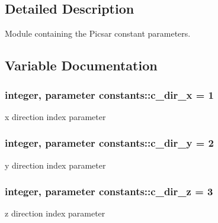 \subsection{Detailed Description}
Module containing the Picsar constant parameters. 

\subsection{Variable Documentation}
\subsubsection[{\texorpdfstring{c\+\_\+dir\+\_\+x}{c_dir_x}}]{\setlength{\rightskip}{0pt plus 5cm}integer, parameter constants\+::c\+\_\+dir\+\_\+x = 1}\hypertarget{namespaceconstants_a8e38e74e9723ce351e7a20787e649e89}{}\label{namespaceconstants_a8e38e74e9723ce351e7a20787e649e89}


x direction index parameter 

\subsubsection[{\texorpdfstring{c\+\_\+dir\+\_\+y}{c_dir_y}}]{\setlength{\rightskip}{0pt plus 5cm}integer, parameter constants\+::c\+\_\+dir\+\_\+y = 2}\hypertarget{namespaceconstants_a5d84bc6ed2e3bd7b6e64704dc587825b}{}\label{namespaceconstants_a5d84bc6ed2e3bd7b6e64704dc587825b}


y direction index parameter 

\subsubsection[{\texorpdfstring{c\+\_\+dir\+\_\+z}{c_dir_z}}]{\setlength{\rightskip}{0pt plus 5cm}integer, parameter constants\+::c\+\_\+dir\+\_\+z = 3}\hypertarget{namespaceconstants_a9d2fa70332164d956c148a895e769983}{}\label{namespaceconstants_a9d2fa70332164d956c148a895e769983}


z direction index parameter 

